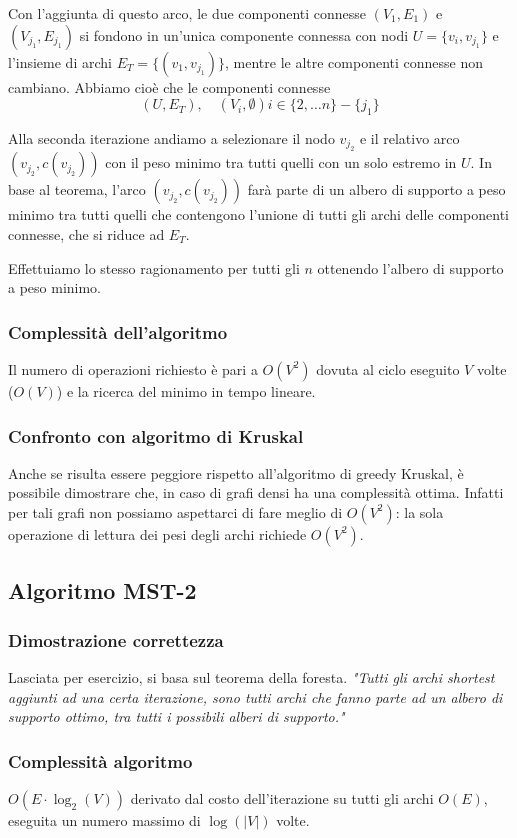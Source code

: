 \documentclass[../template]{subfiles}
\begin{document}
Con l'aggiunta di questo arco, le due componenti connesse $(V_1, E_1)$ e $(V_{j_1}, E_{j_1})$ si fondono in un'unica componente
connessa con nodi $U = \{v_i, v_{j_1}\}$ e l'insieme di archi $E_T = \{(v_1, v_{j_1})\}$, mentre le altre componenti connesse non cambiano.
Abbiamo cioè che le componenti connesse
\[(U, E_T), \quad (V_i, \emptyset) i \in \{2,\ldots n\} - \{j_1\}\]

Alla seconda iterazione andiamo a selezionare il nodo $v_{j_2}$ e il relativo arco $( v_{j_2}, c(v_{j_2}))$ con il peso minimo
tra tutti quelli con un solo estremo in $U$.
In base al teorema, l'arco $(v_{j_2}, c(v_{j_2}))$ farà parte di un albero di supporto a peso minimo tra tutti quelli che contengono
l'unione di tutti gli archi delle componenti connesse, che si riduce ad $E_T$.

Effettuiamo lo stesso ragionamento per tutti gli $n$ ottenendo l'albero di supporto a peso minimo.
\subsubsection{Complessità dell'algoritmo}
Il numero di operazioni richiesto è pari a $O(V^2)$ dovuta al ciclo eseguito $V$ volte ($O(V)$) e la ricerca del minimo in tempo lineare.

\subsubsection{Confronto con algoritmo di Kruskal}
Anche se risulta essere peggiore rispetto all'algoritmo di greedy Kruskal, è possibile dimostrare che, in caso di grafi densi
ha una complessità ottima.
Infatti per tali grafi non possiamo aspettarci di fare meglio di $O(V^2)$: la sola operazione di lettura dei pesi
degli archi richiede $O(V^2)$.

\subsection{Algoritmo MST-2}

\subsubsection{Dimostrazione correttezza}
Lasciata per esercizio, si basa sul teorema della foresta.
\textit{"Tutti gli archi shortest aggiunti ad una certa iterazione, sono tutti archi
che fanno parte ad un albero di supporto ottimo, tra tutti i possibili
alberi di supporto."}

\subsubsection{Complessità algoritmo}
$O(E \cdot \log_2 (V))$ derivato dal costo dell'iterazione su tutti gli archi
$O(E)$, eseguita un numero massimo di $\log(|V|)$ volte.
\end{document}
